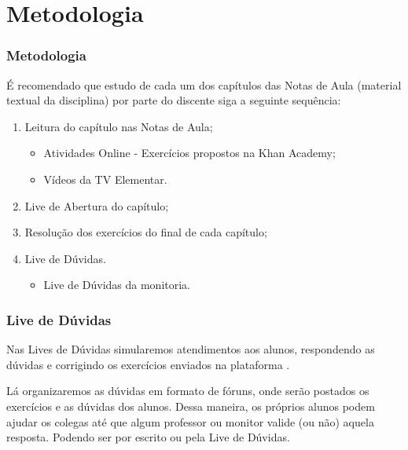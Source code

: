 \section{Metodologia}


\begin{frame}
	\frametitle{Metodologia}

	É recomendado que estudo de cada um dos capítulos das Notas de Aula (material textual da disciplina) por parte do discente siga a seguinte sequência:

	\begin{enumerate}
		\item Leitura do capítulo nas Notas de Aula;
		\begin{itemize}
			\item Atividades Online - Exercícios propostos na Khan Academy;
			\item Vídeos da TV Elementar.
		\end{itemize} \pause
		\item Live de Abertura do capítulo; \pause
		\item Resolução dos exercícios do final de cada capítulo; \pause
		\item Live de Dúvidas.
		\begin{itemize}
			\item Live de Dúvidas da monitoria.
		\end{itemize}
	\end{enumerate}
	
\end{frame}


\begin{frame}
	\frametitle{Live de Dúvidas} 

	Nas Lives de Dúvidas simularemos atendimentos aos alunos, respondendo as dúvidas e corrigindo os exercícios enviados na plataforma .

	Lá organizaremos as dúvidas em formato de fóruns, onde serão postados os exercícios e as dúvidas dos alunos. Dessa maneira, os próprios alunos podem ajudar os colegas até que algum professor ou monitor valide (ou não) aquela resposta. Podendo ser por escrito ou pela Live de Dúvidas.
\end{frame}
